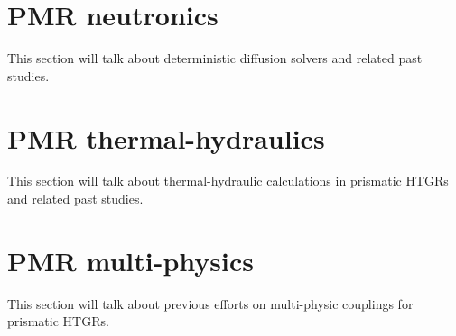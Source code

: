 \section{PMR neutronics}

This section will talk about deterministic diffusion solvers and related past studies.

\section{PMR thermal-hydraulics}

This section will talk about thermal-hydraulic calculations in prismatic HTGRs and related past studies.

\section{PMR multi-physics}

This section will talk about previous efforts on multi-physic couplings for prismatic HTGRs.